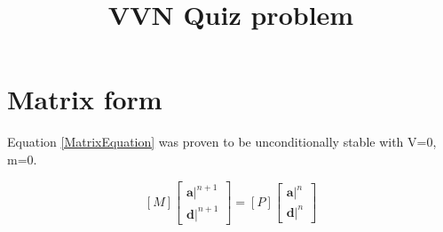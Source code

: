 \documentclass[final, 11pt]{article}
\title{VVN Quiz problem}
\begin{document}


\section{Matrix form}
Equation \ref{MatrixEquation} was proven to be unconditionally stable with V=0, m=0.

\begin{equation}
    \label{MatrixEquation}
    \left[M\right]\left[\begin{matrix*}
        \boldsymbol{a}\vert^{n+1}\\\boldsymbol{d}\vert^{n+1}
    \end{matrix*}\right] = \left[P\right]\left[\begin{matrix*}
        \boldsymbol{a}\vert^{n}\\\boldsymbol{d}\vert^{n}
    \end{matrix*}\right]
\end{equation}
\end{document}
